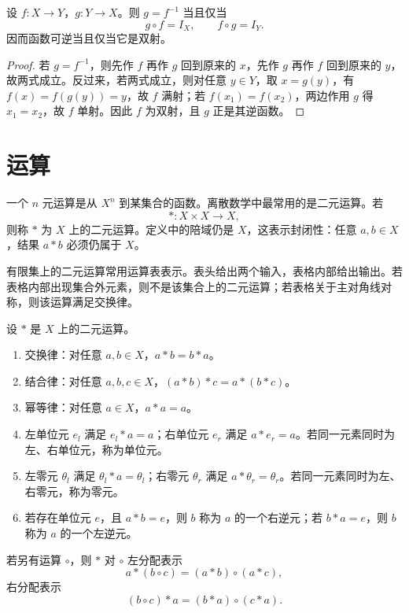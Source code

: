 \begin{theorem}[逆函数判定]\label{inverse-function}
  设 $f:X\to Y$，$g:Y\to X$。则 $g=f^{-1}$ 当且仅当
  \[
  g\circ f=I_X,\qquad f\circ g=I_Y.
  \]
  因而函数可逆当且仅当它是双射。
\end{theorem}

\begin{proof}
  若 $g=f^{-1}$，则先作 $f$ 再作 $g$ 回到原来的 $x$，先作 $g$ 再作 $f$ 回到原来的 $y$，故两式成立。反过来，若两式成立，则对任意 $y\in Y$，取 $x=g(y)$，有 $f(x)=f(g(y))=y$，故 $f$ 满射；若 $f(x_1)=f(x_2)$，两边作用 $g$ 得 $x_1=x_2$，故 $f$ 单射。因此 $f$ 为双射，且 $g$ 正是其逆函数。
\end{proof}

\section{运算}

一个 $n$ 元运算是从 $X^n$ 到某集合的函数。离散数学中最常用的是二元运算。若
\[
*:X\times X\to X,
\]
则称 $*$ 为 $X$ 上的二元运算。定义中的陪域仍是 $X$，这表示封闭性：任意 $a,b\in X$，结果 $a*b$ 必须仍属于 $X$。


有限集上的二元运算常用运算表表示。表头给出两个输入，表格内部给出输出。若表格内部出现集合外元素，则不是该集合上的二元运算；若表格关于主对角线对称，则该运算满足交换律。

\begin{definition}[运算律和特殊元素]\label{ch03-operation-laws}
  设 $*$ 是 $X$ 上的二元运算。
  \begin{enumerate}
    \item 交换律：对任意 $a,b\in X$，$a*b=b*a$。
    \item 结合律：对任意 $a,b,c\in X$，$(a*b)*c=a*(b*c)$。
    \item 幂等律：对任意 $a\in X$，$a*a=a$。
    \item 左单位元 $e_l$ 满足 $e_l*a=a$；右单位元 $e_r$ 满足 $a*e_r=a$。若同一元素同时为左、右单位元，称为单位元。
    \item 左零元 $\theta_l$ 满足 $\theta_l*a=\theta_l$；右零元 $\theta_r$ 满足 $a*\theta_r=\theta_r$。若同一元素同时为左、右零元，称为零元。
    \item 若存在单位元 $e$，且 $a*b=e$，则 $b$ 称为 $a$ 的一个右逆元；若 $b*a=e$，则 $b$ 称为 $a$ 的一个左逆元。
  \end{enumerate}
  若另有运算 $\circ$，则 $*$ 对 $\circ$ 左分配表示
  \[
  a*(b\circ c)=(a*b)\circ(a*c),
  \]
  右分配表示
  \[
  (b\circ c)*a=(b*a)\circ(c*a).
  \]
\end{definition}

